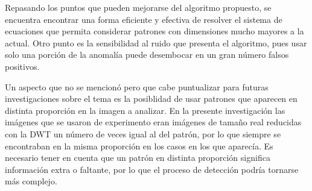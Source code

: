 \begin{recomendations}
    \par Repasando los puntos que pueden mejorarse del algoritmo propuesto, se encuentra encontrar una forma eficiente y efectiva de resolver el sistema de ecuaciones que permita considerar patrones con dimensiones mucho mayores a la actual. Otro punto es la sensibilidad al ruido que presenta el algoritmo, pues usar solo una porci\'on de la anomal\'ia puede desembocar en un gran n\'umero falsos positivos.
    \par Un aspecto que no se mencion\'o pero que cabe puntualizar para futuras investigaciones sobre el tema es la posiblidad de usar patrones que aparecen en distinta proporci\'on en la imagen a analizar. En la presente investigaci\'on las im\'agenes que se usaron de experimento eran im\'agenes de tama\~no real reducidas con la DWT un n\'umero de veces igual al del patr\'on, por lo que siempre se encontraban en la misma proporci\'on en los casos en los que aparec\'ia. Es necesario tener en cuenta que un patr\'on en distinta proporci\'on significa informaci\'on extra o faltante, por lo que el proceso de detecci\'on podr\'ia tornarse m\'as complejo.
\end{recomendations}
